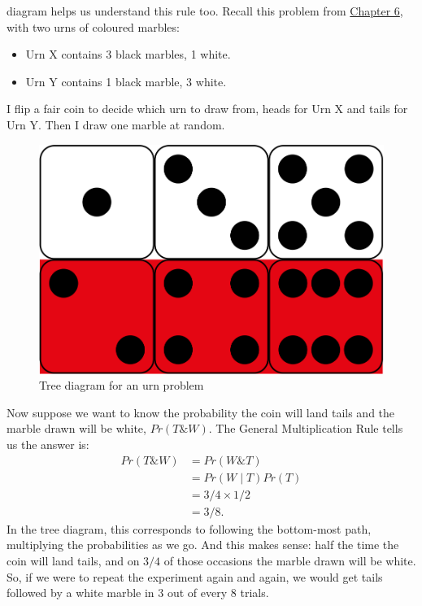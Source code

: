 \documentclass[justified]{tufte-book}
\providecommand{\tightlist}{%
  \setlength{\itemsep}{0pt}\setlength{\parskip}{0pt}}
\newcommand{\given}{\mid}
\renewcommand{\wedge}{\mathbin{\&}}
\newcommand{\p}{Pr}
\theoremstyle{definition}
\theoremstyle{definition}
\theoremstyle{definition}
\theoremstyle{definition}
\theoremstyle{remark}
\begin{document}
 diagram helps us understand this rule too. Recall this problem from \protect\hyperlink{conditional-probability}{Chapter 6}, with two urns of coloured marbles:

\begin{itemize}
\tightlist
\item
  Urn X contains 3 black marbles, 1 white.
\item
  Urn Y contains 1 black marble, 3 white.
\end{itemize}

I flip a fair coin to decide which urn to draw from, heads for Urn X and tails for Urn Y. Then I draw one marble at random.

\begin{figure}
\includegraphics{_main_files/figure-latex/unnamed-chunk-61-1} \caption[Tree diagram for an urn problem]{Tree diagram for an urn problem}\label{fig:unnamed-chunk-61}
\end{figure}

Now suppose we want to know the probability the coin will land tails and the marble drawn will be white, \(\p(T \wedge W)\). The General Multiplication Rule tells us the answer is:
\[
  \begin{aligned}
    \p(T \wedge W) &= \p(W \wedge T)\\
                   &= \p(W \given T) \p(T)\\
                   &= 3/4 \times 1/2\\
                   &= 3/8.
  \end{aligned}
\]
In the tree diagram, this corresponds to following the bottom-most path, multiplying the probabilities as we go. And this makes sense: half the time the coin will land tails, and on \(3/4\) of those occasions the marble drawn will be white. So, if we were to repeat the experiment again and again, we would get tails followed by a white marble in \(3\) out of every \(8\) trials.
\end{document}
